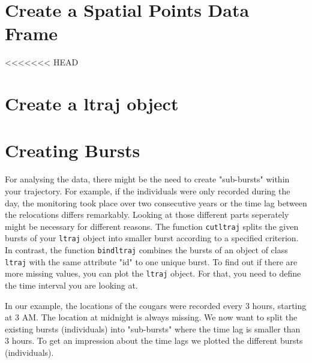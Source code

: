 \documentclass[11pt, a4paper]{article} %
\begin{document}
\section{Create a Spatial Points Data Frame}%

<<<<<<< HEAD
\section{Create a ltraj object}%


\section{Creating Bursts}%

For analysing the data, there might be the need to create "sub-bursts" within your trajectory. For example, if the individuals were only recorded during the day, the monitoring took place over two consecutive years or the time lag between the relocations differs remarkably. Looking at those different parts seperately might be necessary for different reasons. The function \texttt{cutltraj} splits the given bursts of your \texttt{ltraj} object into smaller burst according to a specified criterion. In contrast, the function \texttt{bindltraj} combines the bursts of an object of class \texttt{ltraj} with the same attribute "id" to one unique burst. \cite{Package2011} To find out if there are more missing values, you can plot the \texttt{ltraj} object. For that, you need to define the time interval you are looking at. 


In our example, the locations of the cougars were recorded every 3 hours, starting at 3 AM. The location at midnight is always missing. We now want to split the existing bursts (individuals) into "sub-bursts" where the time lag is smaller than 3 hours. To get an impression about the time lags we plotted the different bursts (individuals).

\begin{knitrout}
\color{fgcolor}\begin{kframe}
\begin{alltt}
 \hlstd{)}


 \hlstd{)}

\end{alltt}
\end{kframe}
\end{knitrout}
\end{document}
